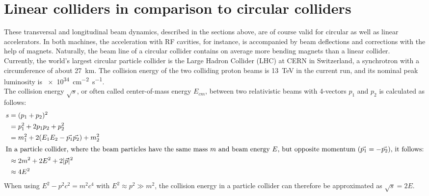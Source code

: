 \section{Linear colliders in comparison to circular colliders}
\label{AccPhysics:Linear-Circular}
These transversal and longitudinal beam dynamics, described in the sections above, are of course valid for circular as well as linear accelerators.
In both machines, the acceleration with RF cavities, for instance, is accompanied by beam deflections and corrections with the help of magnets.
Naturally, the beam line of a circular collider contains on average more bending magnets than a linear collider.\\
Currently, the world's largest circular particle collider is the Large Hadron Collider (LHC) at CERN in Switzerland, a synchrotron with a circumference of about \SI{27}{\kilo\meter}.
The collision energy of the two colliding proton beams is \SI{13}{\TeV} in the current run, and its nominal peak luminosity \lumi is \SI{e34}{\centi\meter^{-2}\second^{-1}}.~\cite[p. 3]{LHC_Paper}\\
The collision energy $\sqrt{s}$, or often called center-of-mass energy $E_{cm}$, between two relativistic beams with 4-vectors $p_1$ and $p_2$ is calculated as follows:
\begin{align*}
 s &= (p_1+p_2)^2\\
 &=p_1^2+2p_1p_2+p_2^2\\
 &=m_1^2+2(E_1E_2-\vec{p_1}\vec{p_2})+m_2^2\\
\intertext{In a particle collider, where the beam particles have the same mass $m$ and beam energy $E$, but opposite momentum ($\vec{p_1}=-\vec{p_2}$), it follows:}
&\approx2m^2+2E^2+2|\vec{p}|^2\\
&\approx4E^2
\end{align*}
When using $E^2-p^2c^2=m^2c^4$ with $E^2\approx p^2 \gg m^2$, the collision energy in a particle collider can therefore be approximated as $\sqrt{s}=2E$.


